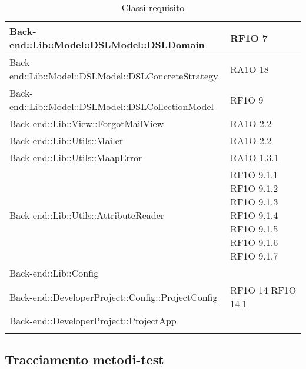 \begin{center}
\begin{longtable}{ | p{11cm} | p{3cm} | }
	Back-end::Lib::Model::DSLModel::DSLDomain & RF1O 7 \\ \hline
	
	Back-end::Lib::Model::DSLModel::DSLConcreteStrategy & RA1O 18 \\ \hline
	
	Back-end::Lib::Model::DSLModel::DSLCollectionModel & RF1O 9 \\ \hline
	
	Back-end::Lib::View::ForgotMailView & RA1O 2.2 \\ \hline
	
	Back-end::Lib::Utils::Mailer & RA1O 2.2 \\ \hline
	
	Back-end::Lib::Utils::MaapError & RA1O 1.3.1 \\ \hline
	
	Back-end::Lib::Utils::AttributeReader & RF1O 9.1.1 \newline RF1O 9.1.2 \newline RF1O 9.1.3 \newline RF1O 9.1.4 \newline 
										RF1O 9.1.5 \newline RF1O 9.1.6 \newline RF1O 9.1.7 \\ \hline

	Back-end::Lib::Config & \\ \hline
	
	Back-end::DeveloperProject::Config::ProjectConfig & RF1O 14 \newline RF1O 14.1 \\ \hline
	
	Back-end::DeveloperProject::ProjectApp & \\ \hline
	

	\caption{Classi-requisito}
      \end{longtable}
      \egroup
      \end{center}  
\clearpage

\subsection{Tracciamento metodi-test}
   
